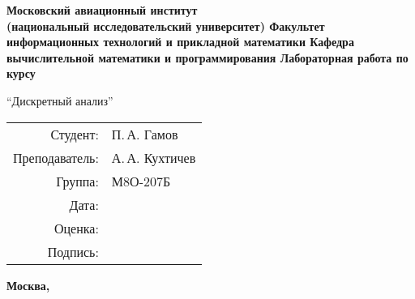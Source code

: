 \begin{titlepage}
\begin{center}
\bfseries
{\Large Московский авиационный институт\\ (национальный исследовательский университет)}
\vspace{48pt}
{\large Факультет информационных технологий и прикладной математики}
\vspace{36pt}
{\large Кафедра вычислительной математики и программирования}
\vspace{48pt}
Лабораторная работа  по курсу 

\enquote{Дискретный анализ}
\end{center}
\vspace{72pt}

\begin{flushright}
\begin{tabular}{rl}
Студент: & П.\,А. Гамов \\
Преподаватель: & А.\,А. Кухтичев \\
Группа: & М8О-207Б \\
Дата: & \\
Оценка: & \\
Подпись: & \\
\end{tabular}
\end{flushright}
\vfill
\begin{center}
\bfseries
Москва, \the\year
\end{center}
\end{titlepage}

\pagebreak